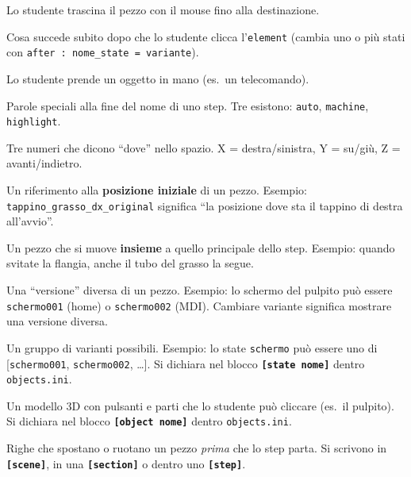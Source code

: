 ﻿\documentclass[a4paper,12pt,oneside]{book}
\newcommand{\kw}[1]{\texttt{\color{keycolor}#1}}
\newcommand{\val}[1]{\texttt{\color{cvtgreen}#1}}
\newcommand{\sez}[1]{\texttt{\color{sectioncolor}\textbf{#1}}}
\newcommand{\file}[1]{\texttt{#1}}
\begin{document}
\begin{description}[leftmargin=2.5cm,style=nextline]
\item[\textbf{Drag}]
Lo studente trascina il pezzo con il mouse fino alla destinazione.

\item[\textbf{After}]
Cosa succede subito dopo che lo studente clicca l'\kw{element} (cambia uno o
più stati con \texttt{after : nome\_state = variante}).

\item[\textbf{Hold}]
Lo studente prende un oggetto in mano (es.\ un telecomando).

\item[\textbf{Bandierine}]
Parole speciali alla fine del nome di uno step. Tre esistono:
\val{auto}, \val{machine}, \val{highlight}.

\item[\textbf{Coordinate (x, y, z)}]
Tre numeri che dicono ``dove'' nello spazio. X = destra/sinistra, Y = su/giù,
Z = avanti/indietro.

\item[\textbf{Origin} (suffisso \texttt{\_original})]
Un riferimento alla \textbf{posizione iniziale} di un pezzo. Esempio:
\texttt{tappino\_grasso\_dx\_original} significa ``la posizione dove sta il
tappino di destra all'avvio''.

\item[\textbf{Companion} (compagno)]
Un pezzo che si muove \textbf{insieme} a quello principale dello step.
Esempio: quando svitate la flangia, anche il tubo del grasso la segue.

\item[\textbf{Variant} (variante)]
Una ``versione'' diversa di un pezzo. Esempio: lo schermo del pulpito può
essere \texttt{schermo001} (home) o \texttt{schermo002} (MDI). Cambiare
variante significa mostrare una versione diversa.

\item[\textbf{State} (stato)]
Un gruppo di varianti possibili. Esempio: lo state \texttt{schermo} può
essere uno di [\texttt{schermo001}, \texttt{schermo002}, \ldots].
Si dichiara nel blocco \sez{[state nome]} dentro \file{objects.ini}.

\item[\textbf{Object} (oggetto interattivo)]
Un modello 3D con pulsanti e parti che lo studente può cliccare
(es.\ il pulpito). Si dichiara nel blocco \sez{[object nome]} dentro
\file{objects.ini}.

\item[\textbf{Position} / \textbf{Rotation}]
Righe che spostano o ruotano un pezzo \emph{prima} che lo step parta. Si
scrivono in \sez{[scene]}, in una \sez{[section]} o dentro uno \sez{[step]}.


\end{description}
\end{document}
